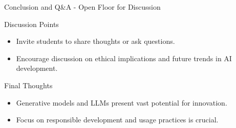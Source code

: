\documentclass[aspectratio=169]{beamer}
\begin{document}
\begin{frame}[fragile]{Conclusion and Q\&A - Open Floor for Discussion}
    \begin{block}{Discussion Points}
        \begin{itemize}
            \item Invite students to share thoughts or ask questions.
            \item Encourage discussion on ethical implications and future trends in AI development.
        \end{itemize}
    \end{block}
    
    \begin{block}{Final Thoughts}
        \begin{itemize}
            \item Generative models and LLMs present vast potential for innovation.
            \item Focus on responsible development and usage practices is crucial.
        \end{itemize}
    \end{block}
\end{frame}
\end{document}
